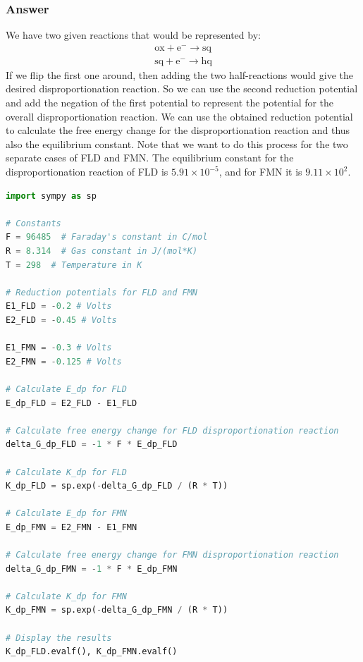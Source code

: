 \documentclass[12pt]{article}
\begin{document}
\subsubsection{Answer}
We have two given reactions that would be represented by:
\begin{equation}
\begin{array}{l}
\mathrm{ox}+\mathrm{e}^{-} \rightarrow \mathrm{sq} \\
\mathrm{sq}+\mathrm{e}^{-} \rightarrow \mathrm{hq}
\end{array}
\end{equation}
If we flip the first one around, then adding the two half-reactions would give the desired disproportionation reaction. So we can use the second reduction potential and add the negation of the first potential to represent the potential for the overall disproportionation reaction. We can use the obtained reduction potential to calculate the free energy change for the disproportionation reaction and thus also the equilibrium constant. Note that we want to do this process for the two separate cases of FLD and FMN. The equilibrium constant for the disproportionation reaction of FLD is $5.91 \times 10^{-5}$, and for FMN it is $9.11 \times 10^{2}$.
\begin{lstlisting}[language=Python]
import sympy as sp

# Constants
F = 96485  # Faraday's constant in C/mol
R = 8.314  # Gas constant in J/(mol*K)
T = 298  # Temperature in K

# Reduction potentials for FLD and FMN
E1_FLD = -0.2 # Volts
E2_FLD = -0.45 # Volts

E1_FMN = -0.3 # Volts
E2_FMN = -0.125 # Volts

# Calculate E_dp for FLD
E_dp_FLD = E2_FLD - E1_FLD

# Calculate free energy change for FLD disproportionation reaction
delta_G_dp_FLD = -1 * F * E_dp_FLD

# Calculate K_dp for FLD
K_dp_FLD = sp.exp(-delta_G_dp_FLD / (R * T))

# Calculate E_dp for FMN
E_dp_FMN = E2_FMN - E1_FMN

# Calculate free energy change for FMN disproportionation reaction
delta_G_dp_FMN = -1 * F * E_dp_FMN

# Calculate K_dp for FMN
K_dp_FMN = sp.exp(-delta_G_dp_FMN / (R * T))

# Display the results
K_dp_FLD.evalf(), K_dp_FMN.evalf()

\end{lstlisting}
\end{document}
